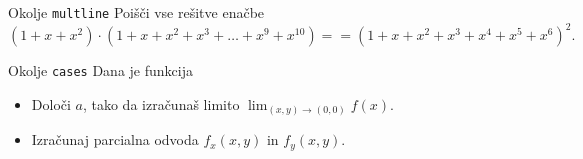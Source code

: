 \begin{frame}{Okolje \texttt{multline}}
	Poišči vse rešitve enačbe
	\[
	(1+x+x^2) \cdot (1+x+x^2+x^3+\ldots+x^9+x^{10}) = 
	=(1+x+x^2+x^3+x^4+x^5+x^6)^2.
	\]
\end{frame}

\begin{frame}{Okolje \texttt{cases}}
	Dana je funkcija
	
		
	\begin{itemize}
	\item Določi $a$, tako da izračunaš limito \( \lim_{(x,y)\to(0,0)} f(x). \)
	\item Izračunaj parcialna odvoda $f_x(x,y)$ in $f_y(x,y)$.
	\end{itemize}
\end{frame}
